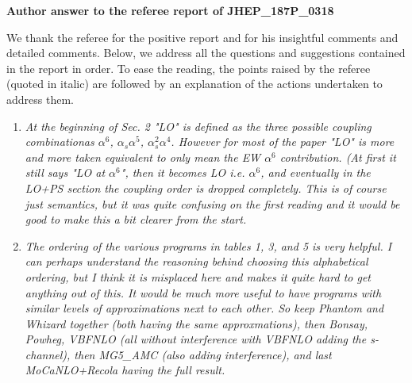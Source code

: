 \documentclass{report}
\begin{document}
\noindent

\begin{center}
  \LARGE \textbf{Author answer to the referee report of JHEP\_187P\_0318}
\end{center}
\vspace{0.5cm}
We thank the referee for the positive report and for his insightful comments and detailed comments. Below, we address all the questions and suggestions contained in the report in order. To ease the reading, the points raised by the referee (quoted in italic) are followed by an  explanation of the actions undertaken to address them. 

\vspace{0.5cm}
\begin{enumerate}

    \item \emph{ At the beginning of Sec. 2 "LO" is defined as the three possible coupling
combinationas $\alpha^6$, $\alpha_s \alpha^5$, $\alpha_s^2 \alpha^4$. However for most of the paper "LO" is more 
and more taken equivalent to only mean the EW $\alpha^6$ contribution. (At first it still says "LO at $\alpha^6$", 
then it becomes
LO i.e. $\alpha^6$, and eventually in the LO+PS section the coupling order is dropped completely. 
This is of course just semantics, but it was quite confusing on the first reading and it would be good to make this a bit clearer from the start.}

    \item \emph{The ordering of the various programs in tables 1, 3, and 5 is very helpful.
I can perhaps understand the reasoning behind choosing this alphabetical
ordering, but I think it is misplaced here and makes it quite hard to get
anything out of this. It would be much more useful to have programs with similar levels of approximations next to each other. So keep Phantom and Whizard together (both having the same approxmations), then Bonsay, Powheg, VBFNLO (all without interference with VBFNLO adding the s-channel), then MG5\_AMC (also adding interference), and last MoCaNLO+Recola having the full result.}


\end{enumerate}
\end{document}
